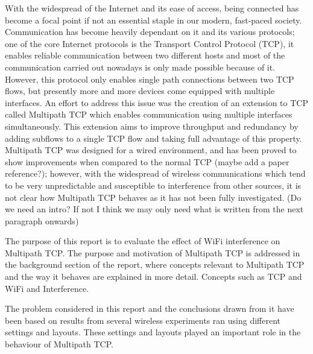 With the widespread of the Internet and its ease of access, being connected has become a focal point if not an essential staple in our modern, fast-paced society. Communication has become heavily dependant on it and its various protocols; one of the core Internet protocols is the Transport Control Protocol (TCP), it enables reliable communication between two different hosts and most of the communication carried out nowadays is only made possible because of it. However, this protocol only enables single path connections between two TCP flows, but presently more and more devices come equipped with multiple interfaces.
An effort to address this issue was the creation of an extension to TCP called Multipath TCP which enables communication using multiple interfaces simultaneously. This extension aims to improve throughput and redundancy by adding subflows to a single TCP flow and taking full advantage of this property.
Multipath TCP was designed for a wired environment, and has been proved to show improvements when compared to the normal TCP (maybe add a paper reference?); however, with the widespread of wireless communications which tend to be very unpredictable and susceptible to interference from other sources, it is not clear how Multipath TCP behaves as it has not been fully investigated. (Do we need an intro? If not I think we may only need what is written from the next paragraph onwards)

The purpose of this report is to evaluate the effect of WiFi interference on Multipath TCP.
The purpose and motivation of Multipath TCP is addressed in the background section of the report, where concepts relevant to Multipath TCP and the way it behaves are explained in more detail. Concepts such as TCP and WiFi and Interference.
 
The problem considered in this report and the conclusions drawn from it have been based on results from several wireless experiments ran using different settings and layouts.
These settings and layouts played an important role in the behaviour of Multipath TCP.
 
